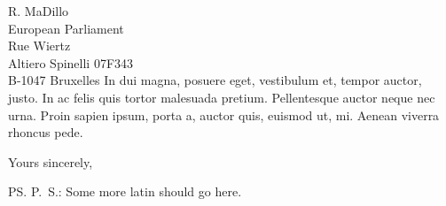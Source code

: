 \documentclass[a4paper,12pt]{letter}
\begin{document}
\begin{letter}{
    R. MaDillo\\
    European Parliament\\
    Rue Wiertz\\
    Altiero Spinelli 07F343\\
    B-1047 Bruxelles 
  }
In dui magna, posuere eget, vestibulum et, tempor auctor, justo. In ac felis 
quis tortor malesuada pretium. Pellentesque auctor neque nec urna. Proin 
sapien ipsum, porta a, auctor quis, euismod ut, mi. Aenean viverra rhoncus 
pede. 

\closing{Yours sincerely,}
%
\ps{P.\ S.: Some more latin should go here.}

\vspace{1cm}
\begingroup
\def\enotesize{\small}
\def\enoteheading{\Large \textsc{Notes}}
\theendnotes
\endgroup
\end{letter}
\end{document}
